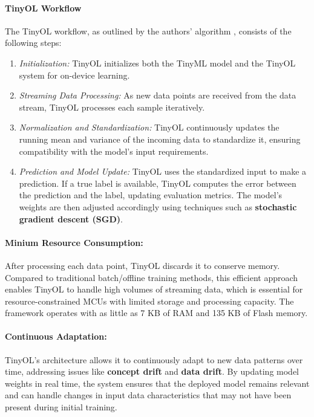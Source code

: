 \documentclass[twocolumn]{article}
\begin{document}
\paragraph{TinyOL Workflow}
The TinyOL workflow, as outlined by the authors’ algorithm \cite{ren_tinyol_2021}, consists of the following steps:
\begin{enumerate}
    \item \textit{Initialization:} TinyOL initializes both the TinyML model and the TinyOL system for on-device learning.
    \item \textit{Streaming Data Processing:} As new data points are received from the data stream, TinyOL processes each sample iteratively.
    \item \textit{Normalization and Standardization:} TinyOL continuously updates the running mean and variance of the incoming data to standardize it, ensuring compatibility with the model’s input requirements.
    \item \textit{Prediction and Model Update:} TinyOL uses the standardized input to make a prediction. If a true label is available, TinyOL computes the error between the prediction and the label, updating evaluation metrics. The model’s weights are then adjusted accordingly using techniques such as \textbf{stochastic gradient descent (SGD)}.
\end{enumerate}

\paragraph{Minium Resource Consumption:}
After processing each data point, TinyOL discards it to conserve memory. Compared to traditional batch/offline training methods, this efficient approach enables TinyOL to handle high volumes of streaming data, which is essential for resource-constrained MCUs with limited storage and processing capacity. The framework operates with as little as 7 KB of RAM and 135 KB of Flash memory.

\paragraph{Continuous Adaptation:}
TinyOL’s architecture allows it to continuously adapt to new data patterns over time, addressing issues like \textbf{concept drift} and \textbf{data drift}. By updating model weights in real time, the system ensures that the deployed model remains relevant and can handle changes in input data characteristics that may not have been present during initial training.
\end{document}
